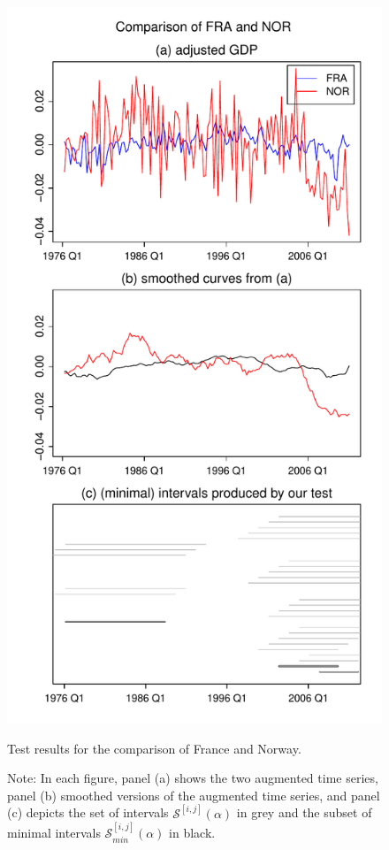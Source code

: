 \documentclass[a4paper,12pt]{article}
\begin{document}
{\begin{figure}[p!]
\begin{minipage}[t]{0.49\textwidth}
\includegraphics[width=\textwidth]{plots/FRA_vs_NOR}
\caption{Test results for the comparison of France and Norway.}\label{fig:France:Norway}
\end{minipage}

\caption*{Note: In each figure, panel (a) shows the two augmented time series, panel (b) smoothed versions of the augmented time series, and panel (c) depicts the set of intervals $\mathcal{S}^{[i,j]}(\alpha)$ in grey and the subset of minimal intervals $\mathcal{S}^{[i,j]}_{min}(\alpha)$ in black.}
\end{figure}

}
\end{document}
